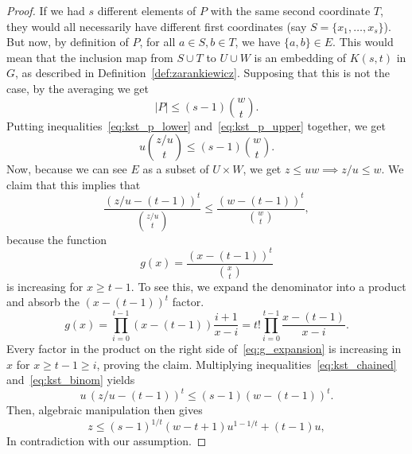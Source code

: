 \begin{theorem}
\begin{proof}
        If we had $s$ different elements of $P$ with the same second coordinate $T$,
        they would all necessarily have different first coordinates
        (say $S = \{x_1, \dots, x_s\}$).
        But now, by definition of $P$, for all $a \in S, b \in T$, we have $\{a, b\} \in E$.
        This would mean that the inclusion map from $ S \cup T$ to $U \cup W$ is an embedding of
        $K(s, t)$ in $G$, as described in Definition~\ref{def:zarankiewicz}.
        Supposing that this is not the case, by the averaging we get
        \begin{equation} \label{eq:kst_p_upper}
            |P| \leq (s - 1) \binom{w}{t}.
        \end{equation}
        Putting inequalities~\eqref{eq:kst_p_lower} and~\eqref{eq:kst_p_upper}
        together, we get
        \begin{equation} \label{eq:kst_chained}
            u \binom{z / u}{t} \leq (s - 1) \binom{w}{t}.
        \end{equation}
        Now, because we can see $E$ as a subset of $U \times W$,
        we get $z \leq uw \implies z/u \leq w$.
        We claim that this implies that
        \begin{equation} \label{eq:kst_binom}
            \frac{(z/u - (t - 1))^t}{\binom{z/u}{t}} \leq \frac{(w - (t - 1))^t}{\binom{w}{t}},
        \end{equation}
        because the function
        \[
            g(x) = \frac{(x - (t - 1))^t}{\binom{x}{t}}
        \]
        is increasing for $x \geq t - 1$.
        To see this, we expand the denominator into a product and absorb the $(x - (t - 1))^t$ factor.
        \begin{equation} \label{eq:g_expansion}
            g(x) = \prod_{i=0}^{t-1} (x-(t-1)) \frac{i+1}{x-i} = t! \prod_{i=0}^{t-1} \frac{x-(t-1)}{x-i}.
        \end{equation}
        Every factor in the product on the right side of~\eqref{eq:g_expansion} is increasing
        in $x$ for $x \geq t - 1 \geq i$, proving the claim.
        Multiplying inequalities~\eqref{eq:kst_chained} and~\eqref{eq:kst_binom} yields
        \[
            u \, (z/u - (t - 1))^t \leq (s - 1)(w - (t - 1))^t.
        \]
        Then, algebraic manipulation then gives
        \[
            z \leq (s - 1)^{1 / t}(w - t + 1)u^{1 - 1 / t} + (t - 1)u,
        \]
        In contradiction with our assumption. \qedhere
    \end{proof}

\end{theorem}

